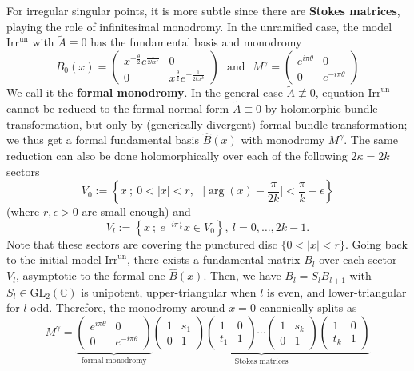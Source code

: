 \documentclass[12]{amsart}
\newcommand{\Irrun}{\boldsymbol{\mathrm{Irr}^{\mathrm{un}}}}
\begin{document}
For irregular singular points, it is more subtle since there are {\bf Stokes matrices}, playing the role of infinitesimal monodromy.
In the unramified case, the model $\Irrun$ with $\tilde A\equiv0$ has the fundamental basis and monodromy
$$B_0(x)=\begin{pmatrix}x^{-\frac{\theta}{2}}e^{\frac{1}{2kx^k}}&0\\ 0&x^{\frac{\theta}{2}}e^{-\frac{1}{2kx^k}}\end{pmatrix}\ \ \ \text{and}\ \ \ M^\gamma=\begin{pmatrix}e^{i\pi\theta}&0\\ 0&e^{-i\pi\theta}\end{pmatrix}$$
We call it the {\bf formal monodromy}. In the general case $\tilde A\not\equiv0$, 
equation $\Irrun$ cannot be reduced to the formal normal form $\tilde A\equiv0$
by holomorphic bundle transformation, but only by (generically divergent) formal bundle transformation;
we thus get a formal fundamental basis $\hat B(x)$ with monodromy $M^\gamma$. 
The same reduction can also be done holomorphically over each of the following $2\kappa=2k$ sectors
$$V_0:=\left\{x\ ;\ 0<\vert x\vert<r,\ \ \ \vert \arg(x)-\frac{\pi}{2k}\vert<\frac{\pi}{k}-\epsilon\right\}$$
(where $r,\epsilon>0$ are small enough) and
$$V_l:=\left\{x\ ;\ e^{-i\pi\frac{l}{k}}x\in V_0 \right\},\ l=0,\ldots,2k-1.$$
Note that these sectors are covering the punctured disc $\{0<\vert x\vert<r\}$. 
Going back to the initial model $\Irrun$, there exists a fundamental matrix $B_l$ over each sector $V_l$,
asymptotic to the formal one $\hat B(x)$.
Then, we have
$B_l=S_lB_{l+1}$ with $S_l\in\mathrm{GL}_2(\mathbb C)$ is unipotent, upper-triangular when $l$ is even,
and lower-triangular for $l$ odd. Therefore, the monodromy around $x=0$ canonically splits as
\begin{equation}\label{eq:StokesDecomp}
M^\gamma=\underbrace{
\begin{pmatrix}e^{i\pi\theta}&0\\ 0&e^{-i\pi\theta}\end{pmatrix}}_{\text{formal monodromy}}
\underbrace{\begin{pmatrix}1&s_1\\ 0&1\end{pmatrix}\begin{pmatrix}1&0\\ t_1&1\end{pmatrix}\cdots
\begin{pmatrix}1&s_k\\ 0&1\end{pmatrix}\begin{pmatrix}1&0\\ t_k&1\end{pmatrix}}_{\text{Stokes matrices}}
\end{equation}
\end{document}
